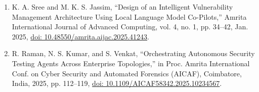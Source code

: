 \documentclass[journal]{IEEEtran}
\begin{document}
\begin{enumerate}
\item K. A. Sree and M. K. S. Jassim, ``Design of an Intelligent Vulnerability Management Architecture Using Local Language Model Co-Pilots,'' Amrita International Journal of Advanced Computing, vol. 4, no. 1, pp. 34--42, Jan. 2025, \href{https://doi.org/10.48550/amrita.aijac.2025.41243}{doi: 10.48550/amrita.aijac.2025.41243}.

\item R. Raman, N. S. Kumar, and S. Venkat, ``Orchestrating Autonomous Security Testing Agents Across Enterprise Topologies,'' in Proc. Amrita International Conf. on Cyber Security and Automated Forensics (AICAF), Coimbatore, India, 2025, pp. 112--119, \href{https://doi.org/10.1109/AICAF58342.2025.10234567}{doi: 10.1109/AICAF58342.2025.10234567}.

\end{enumerate}
\end{document}
